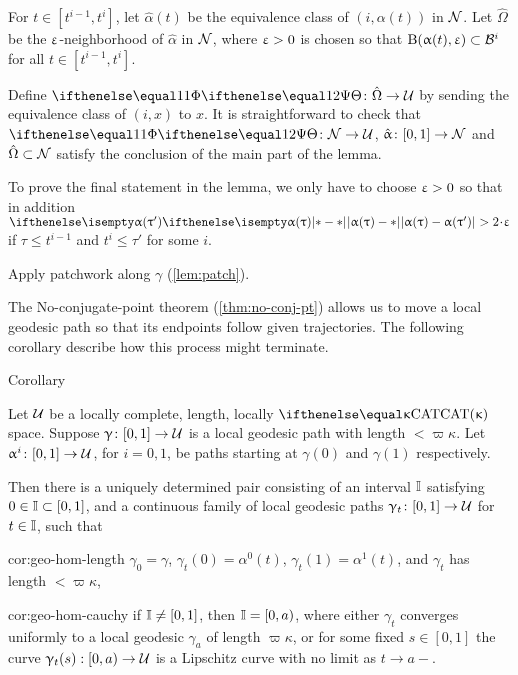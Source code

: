 For $t\in[t^{i-1},t^i]$, let $\hat\alpha(t)$  be the equivalence class of $(i,\alpha(t))$ in $\mathcal{N}$.
Let $\hat\Omega$ be the $\upvarepsilon$-neighborhood of $\hat\alpha$ in $\mathcal{N}$, where $\upvarepsilon>0$ is chosen so that $\oBall(\alpha(t),\eps)\subset\spc{B}^i$ for all $t\in[t^{i-1},t^i]$.

Define $\map\:\hat\Omega\to\spc{U}$
by sending the equivalence class of $(i,x)$ to $x$.
It is straightforward to check that $\map\:\spc{N}\to\spc{U}$, $\hat\alpha\:[0,1]\to\spc{N}$ and $\hat\Omega\subset\spc{N}$ satisfy the conclusion of the main part of the lemma.

To prove the final statement in the lemma,
we only have to choose $\upvarepsilon>0$ so that in addition $\dist{\alpha(\tau)}{\alpha(\tau')}{}>2\cdot\eps$ if $\tau\le t^{i-1}$ and $t^i\le\tau'$ for some $i$.
\qeds


Apply patchwork along $\gamma$ (\ref{lem:patch}). 
\qeds



The No-conjugate-point theorem (\ref{thm:no-conj-pt}) allows us to move a local geodesic path 
so that its endpoints follow given trajectories.
The following corollary describe how this process might terminate. 

\begin{thm}{Corollary}\label{cor:geo-hom}{\sloppy 
Let $\mathcal{U}$ be a locally complete, length, locally $\CAT\kappa$ space.
Suppose $\gamma\:[0,1]\to\spc{U}$ is a local geodesic path with length $< \varpi\kappa$.  Let $\alpha^i\:[0,1]\to \spc{U}$, for $i=0,1$, be paths starting at $\gamma(0)$ and $\gamma(1)$ respectively.  

}

Then there is a uniquely determined pair consisting of an interval $\mathbb{I} $ satisfying $0\in \II\subset[0,1]$, and a continuous family of local geodesic paths $\gamma_t\:[0,1]\to \spc{U}$ for  $t\in \II$, such that  

\begin{subthm}{cor:geo-hom-length}
$\gamma_0=\gamma$, $\gamma_t(0)=\alpha^0(t)$, $\gamma_t(1)=\alpha^1(t)$, and $\gamma_t$ has length $< \varpi\kappa$,
\end{subthm} 

\begin{subthm}{cor:geo-hom-cauchy}
if $\mathbb{I}\ne [0,1]$, then $\mathbb{I}=[0, a)$, where either $\gamma_t$ converges uniformly to a local geodesic $\gamma_a$ of length $\varpi\kappa$, or 
for some fixed $s\in [0,1]$ the curve $\gamma_t(s):[0,a)\to\spc{U}$ is a Lipschitz curve with no limit as $t\to a-$.
\end{subthm}

\end{thm}



